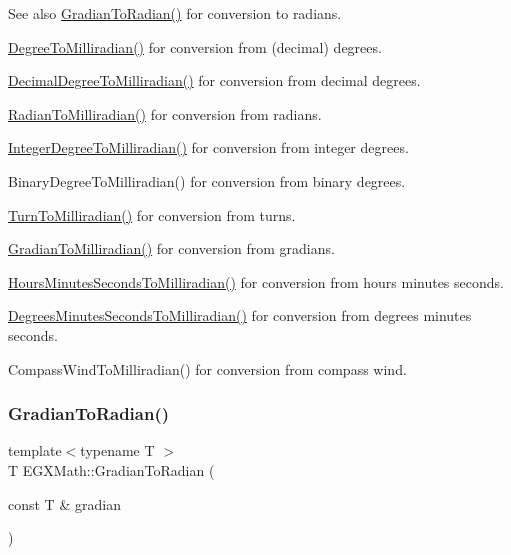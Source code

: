 \begin{DoxySeeAlso}{See also}
\mbox{\hyperlink{group___e_g_x_math-_angle_conversions-_gradian_ga7ea0a6f47a672715b960181606c8fd7b}{Gradian\+To\+Radian()}} for conversion to radians. 

\mbox{\hyperlink{group___e_g_x_math-_angle_conversions-_degree_gae4fa6c2d3805430760783650cfbfdb11}{Degree\+To\+Milliradian()}} for conversion from (decimal) degrees. 

\mbox{\hyperlink{group___e_g_x_math-_angle_conversions-_decimal_degree_gab567d02d4692d9642a4ad219e479713a}{Decimal\+Degree\+To\+Milliradian()}} for conversion from decimal degrees. 

\mbox{\hyperlink{group___e_g_x_math-_angle_conversions-_radian_gaea391f0cca39b05e298dd1cae162e7f1}{Radian\+To\+Milliradian()}} for conversion from radians. 

\mbox{\hyperlink{group___e_g_x_math-_angle_conversions-_integer_degree_ga5379a68bdff5cc4fab5bb1ba06ef9453}{Integer\+Degree\+To\+Milliradian()}} for conversion from integer degrees. 

Binary\+Degree\+To\+Milliradian() for conversion from binary degrees. 

\mbox{\hyperlink{group___e_g_x_math-_angle_conversions-_turn_ga2aea2621472294ce4c25ac7e55db51c6}{Turn\+To\+Milliradian()}} for conversion from turns. 

\mbox{\hyperlink{group___e_g_x_math-_angle_conversions-_gradian_ga144f1019dc760268a163d81fcb3ce482}{Gradian\+To\+Milliradian()}} for conversion from gradians. 

\mbox{\hyperlink{group___e_g_x_math-_angle_conversions-_hours_minutes_seconds_gad78a90abaed52ca9d5fe6b4287c4a5f3}{Hours\+Minutes\+Seconds\+To\+Milliradian()}} for conversion from hours minutes seconds. 

\mbox{\hyperlink{group___e_g_x_math-_angle_conversions-_degrees_minutes_seconds_gacadb912be6af5dac1db702db86a69eeb}{Degrees\+Minutes\+Seconds\+To\+Milliradian()}} for conversion from degrees minutes seconds. 

Compass\+Wind\+To\+Milliradian() for conversion from compass wind. 
\end{DoxySeeAlso}
\mbox{\label{group___e_g_x_math-_angle_conversions-_gradian_ga7ea0a6f47a672715b960181606c8fd7b}} 
\subsubsection{\texorpdfstring{Gradian\+To\+Radian()}{GradianToRadian()}}
{\footnotesize\ttfamily template$<$typename T $>$ \\
T E\+G\+X\+Math\+::\+Gradian\+To\+Radian (\begin{DoxyParamCaption}\item[{const T \&}]{gradian }\end{DoxyParamCaption})}



